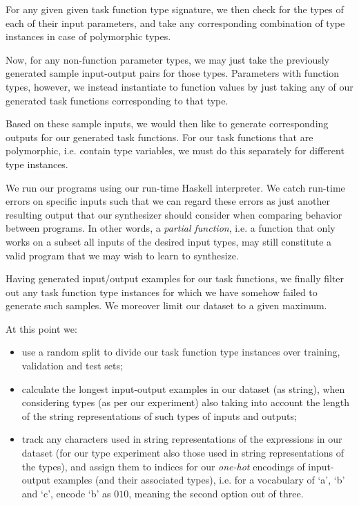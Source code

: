 \documentclass{article}
\begin{document}
For any given given task function type signature,
we then check for the types of each of their input parameters,
and take any corresponding combination of type instances in case of polymorphic types.

Now, for any non-function parameter types,
we may just take the previously generated sample input-output pairs for those types.
Parameters with function types, however,
we instead instantiate to function values by just taking
any of our generated task functions corresponding to that type.

Based on these sample inputs, we would then like to generate corresponding outputs for our generated task functions.
For our task functions that are polymorphic, i.e. contain type variables,
we must do this separately for different type instances.


We run our programs using our run-time Haskell interpreter.
We catch run-time errors on specific inputs such that
we can regard these errors as just another resulting output
that our synthesizer should consider when comparing behavior between programs.
In other words, a \emph{partial function},
i.e. a function that only works on a subset all inputs of the desired input types,
may still constitute a valid program that we may wish to learn to synthesize.

Having generated input/output examples for our task functions,
we finally filter out any task function type instances for which we have somehow failed to generate such samples.
We moreover limit our dataset to a given maximum.

At this point we:
\begin{itemize}
    \item use a random split to divide our task function type instances over training, validation and test sets;
    \item calculate the longest input-output examples in our dataset (as string), when considering types (as per our experiment) also taking into account the length of the string representations of such types of inputs and outputs;
    \item track any characters used in string representations of the expressions in our dataset
    (for our type experiment also those used in string representations of the types),
    and assign them to indices for our \emph{one-hot} encodings of input-output examples (and their associated types),
    i.e. for a vocabulary of `a', `b' and `c', encode `b' as $010$,
    meaning the second option out of three.
\end{itemize}
\end{document}
